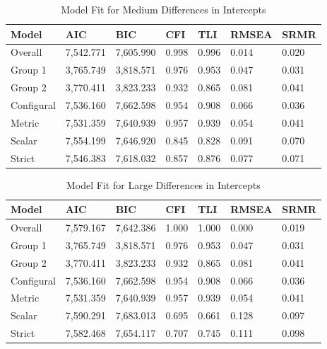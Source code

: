 \documentclass[
  man]{apa7}
\begin{document}
\begin{table}[tbp]

\begin{center}
\begin{threeparttable}

\caption{\label{tab:tab6}Model Fit for Medium Differences in Intercepts}

\begin{tabular}{lllllll}
\toprule
Model & AIC & BIC & CFI & TLI & RMSEA & SRMR\\
\midrule
Overall & 7,542.771 & 7,605.990 & 0.998 & 0.996 & 0.014 & 0.020\\
Group 1 & 3,765.749 & 3,818.571 & 0.976 & 0.953 & 0.047 & 0.031\\
Group 2 & 3,770.411 & 3,823.233 & 0.932 & 0.865 & 0.081 & 0.041\\
Configural & 7,536.160 & 7,662.598 & 0.954 & 0.908 & 0.066 & 0.036\\
Metric & 7,531.359 & 7,640.939 & 0.957 & 0.939 & 0.054 & 0.041\\
Scalar & 7,554.199 & 7,646.920 & 0.845 & 0.828 & 0.091 & 0.070\\
Strict & 7,546.383 & 7,618.032 & 0.857 & 0.876 & 0.077 & 0.071\\
\bottomrule
\end{tabular}

\end{threeparttable}
\end{center}

\end{table}

\begin{table}[tbp]

\begin{center}
\begin{threeparttable}

\caption{\label{tab:tab7}Model Fit for Large Differences in Intercepts}

\begin{tabular}{lllllll}
\toprule
Model & AIC & BIC & CFI & TLI & RMSEA & SRMR\\
\midrule
Overall & 7,579.167 & 7,642.386 & 1.000 & 1.000 & 0.000 & 0.019\\
Group 1 & 3,765.749 & 3,818.571 & 0.976 & 0.953 & 0.047 & 0.031\\
Group 2 & 3,770.411 & 3,823.233 & 0.932 & 0.865 & 0.081 & 0.041\\
Configural & 7,536.160 & 7,662.598 & 0.954 & 0.908 & 0.066 & 0.036\\
Metric & 7,531.359 & 7,640.939 & 0.957 & 0.939 & 0.054 & 0.041\\
Scalar & 7,590.291 & 7,683.013 & 0.695 & 0.661 & 0.128 & 0.097\\
Strict & 7,582.468 & 7,654.117 & 0.707 & 0.745 & 0.111 & 0.098\\
\bottomrule
\end{tabular}

\end{threeparttable}
\end{center}

\end{table}
\end{document}
